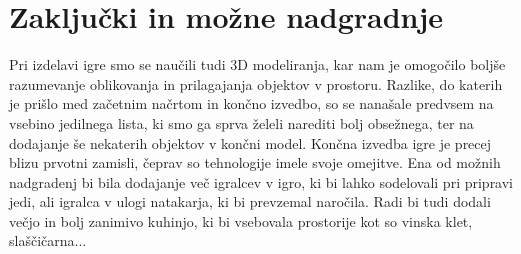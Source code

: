 \documentclass[a4paper]{article}
\begin{document}
\section{Zaključki in možne nadgradnje}
Pri izdelavi igre smo se naučili tudi 3D modeliranja, kar nam je omogočilo boljše razumevanje oblikovanja in prilagajanja objektov v prostoru.
Razlike, do katerih je prišlo med začetnim načrtom in končno izvedbo, so se nanašale predvsem na vsebino jedilnega lista, ki smo ga sprva želeli narediti bolj obsežnega, ter na dodajanje še nekaterih objektov v končni model.
Končna izvedba igre je precej blizu prvotni zamisli, čeprav so tehnologije imele svoje omejitve. 
Ena od možnih nadgradenj bi bila dodajanje več igralcev v igro, ki bi lahko sodelovali pri pripravi jedi, ali igralca v ulogi natakarja, ki bi prevzemal naročila.
Radi bi tudi dodali večjo in bolj zanimivo kuhinjo, ki bi vsebovala prostorije kot so vinska klet, slaščičarna...

\small


\end{document}
